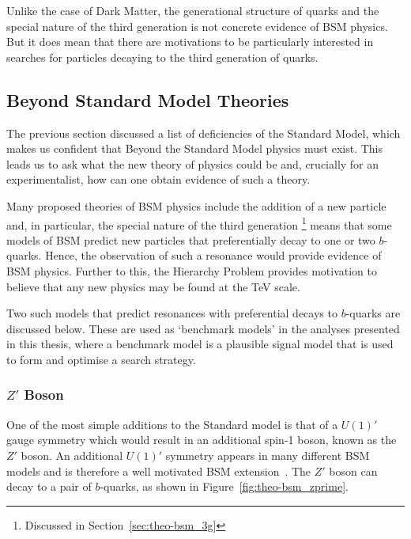 Unlike the case of Dark Matter,
the generational structure of quarks
and the special nature of the third generation is not concrete evidence
of BSM physics.
But it does mean that there are motivations to be particularly interested in
searches for particles decaying to the third generation of quarks.

\newpage
\subsection{Beyond Standard Model Theories}
\label{sec:theo-bsm_models}

The previous section discussed a list of deficiencies of the Standard Model,
which makes us confident that Beyond the Standard Model physics must exist.
This leads us to ask what the new theory of physics could be
and, crucially for an experimentalist,
how can one obtain evidence of such a theory.

Many proposed theories of BSM physics include the addition of a new particle and,
in particular, the special nature of the third generation
\footnote{Discussed in Section~\ref{sec:theo-bsm_3g}}
means that some models of BSM predict new particles
that preferentially decay to one or two $b$-quarks.
Hence, the observation of such a resonance would provide evidence of BSM physics.
Further to this, the Hierarchy Problem provides motivation to believe
that any new physics may be found at the TeV scale.

Two such models that predict resonances with preferential decays to $b$-quarks
are discussed below.
These are used as `benchmark models' in the analyses presented in this thesis,
where a benchmark model is a plausible signal model 
that is used to form and optimise a search strategy.

\subsubsection{$Z'$ Boson}

One of the most simple additions to the Standard model is that of a $U(1)'$ gauge symmetry
which would result in an additional spin-1 boson, known as the $Z'$ boson.
An additional $U(1)'$ symmetry appears in many different BSM models and is therefore a well motivated BSM extension~\cite{theo-bsm_zprime}.
The $Z'$ boson can decay to a pair of $b$-quarks, as shown in Figure~\ref{fig:theo-bsm_zprime}.

